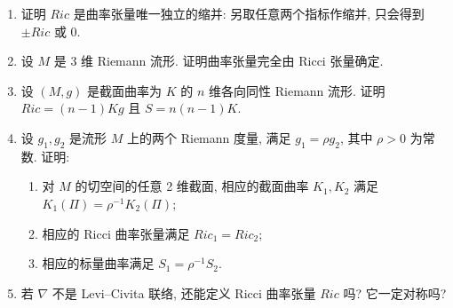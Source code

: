 \begin{RiemannExercise}
\begin{enumerate}[label=(\arabic*),ref=\arabic*,leftmargin=*]
\item\label{ex:ricci-as-only-independent-contraction} 证明 $\mathit{Ric}$ 是曲率张量唯一独立的缩并: 另取任意两个指标作缩并, 只会得到 $\pm\mathit{Ric}$ 或 0.
\item\label{ex:ricci-determines-curvature-in-three-dimensions} 设 $M$ 是 3 维 Riemann 流形. 证明曲率张量完全由 Ricci 张量确定.
\item\label{ex:ricci-and-scalar-curvature-for-isotropic-manifold} 设 $(M,g)$ 是截面曲率为 $K$ 的 $n$ 维各向同性 Riemann 流形. 证明 $\mathit{Ric}=(n-1)Kg$ 且 $S=n(n-1)K$.
\item\label{ex:rescaling-metric-and-curvature} 设 $g_1,g_2$ 是流形 $M$ 上的两个 Riemann 度量, 满足 $g_1=\rho g_2$, 其中 $\rho>0$ 为常数. 证明:
\begin{enumerate}[label=(\alph*),leftmargin=*]
\item 对 $M$ 的切空间的任意 2 维截面, 相应的截面曲率 $K_1,K_2$ 满足 $K_1(\Pi)=\rho^{-1}K_2(\Pi)$;
\item 相应的 Ricci 曲率张量满足 $\mathit{Ric}_1=\mathit{Ric}_2$;
\item 相应的标量曲率满足 $S_1=\rho^{-1}S_2$.
\end{enumerate}
\item\label{ex:ricci-for-general-affine-connection} 若 $\nabla$ 不是 Levi–Civita 联络, 还能定义 Ricci 曲率张量 $\mathit{Ric}$ 吗? 它一定对称吗?
\end{enumerate}
\end{RiemannExercise}
